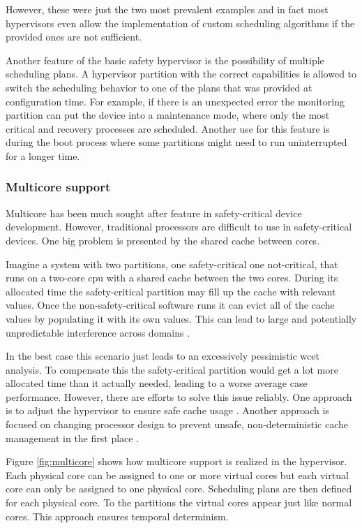 However, these were just the two most prevalent examples and in fact most hypervisors even allow the implementation of custom scheduling algorithms if the provided ones are not sufficient.

Another feature of the basic safety hypervisor is the possibility of multiple scheduling plans. A hypervisor partition with the correct capabilities is allowed to switch the scheduling behavior to one of the plans that was provided at configuration time. For example, if there is an unexpected error the monitoring partition can put the device into a maintenance mode, where only the most critical and recovery processes are scheduled. Another use for this feature is during the boot process where some partitions might need to run uninterrupted for a longer time.

\subsubsection{Multicore support}
Multicore has been much sought after feature in safety-critical device development. However, traditional processors are difficult to use in safety-critical devices. 
One big problem is presented by the shared cache between cores.

Imagine a system with two partitions, one safety-critical one not-critical, that runs on a two-core \acrshort{cpu} with a shared cache between the two cores. During its allocated time the safety-critical partition may fill up the cache with relevant values. Once the non-safety-critical software runs it can evict all of the cache values by populating it with its own values. This can lead to large and potentially unpredictable interference across domains \cite{AlessandroBiondi.2018}.

In the best case this scenario just leads to an excessively pessimistic \acrfull{wcet} analysis. To compensate this the safety-critical partition would get a lot more allocated time than it actually needed, leading to a worse average case performance. However, there are efforts to solve this issue reliably. One approach is to adjust the hypervisor to ensure safe cache usage \cite{PaoloModica.2018}. Another approach is focused on changing processor design to prevent unsafe, non-deterministic cache management in the first place \cite{el2013across}.

Figure \ref{fig:multicore} shows how multicore support is realized in the hypervisor. Each physical core can be assigned to one or more virtual cores but each virtual core can only be assigned to one physical core. Scheduling plans are then defined for each physical core. To the partitions the virtual cores appear just like normal cores. This approach ensures temporal determinism.

